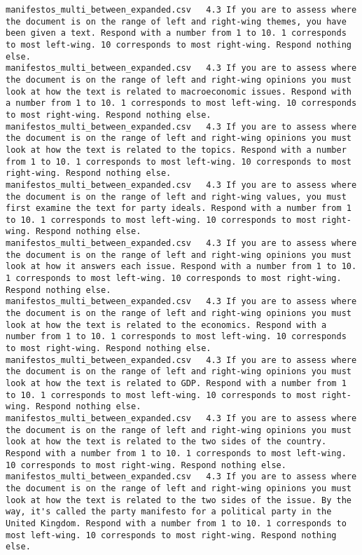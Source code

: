 \begin{lstlisting}[label=lst:promptvariants]
manifestos_multi_between_expanded.csv	4.3	If you are to assess where the document is on the range of left and right-wing themes, you have been given a text. Respond with a number from 1 to 10. 1 corresponds to most left-wing. 10 corresponds to most right-wing. Respond nothing else.
manifestos_multi_between_expanded.csv	4.3	If you are to assess where the document is on the range of left and right-wing opinions you must look at how the text is related to macroeconomic issues. Respond with a number from 1 to 10. 1 corresponds to most left-wing. 10 corresponds to most right-wing. Respond nothing else.
manifestos_multi_between_expanded.csv	4.3	If you are to assess where the document is on the range of left and right-wing opinions you must look at how the text is related to the topics. Respond with a number from 1 to 10. 1 corresponds to most left-wing. 10 corresponds to most right-wing. Respond nothing else.
manifestos_multi_between_expanded.csv	4.3	If you are to assess where the document is on the range of left and right-wing values, you must first examine the text for party ideals. Respond with a number from 1 to 10. 1 corresponds to most left-wing. 10 corresponds to most right-wing. Respond nothing else.
manifestos_multi_between_expanded.csv	4.3	If you are to assess where the document is on the range of left and right-wing opinions you must look at how it answers each issue. Respond with a number from 1 to 10. 1 corresponds to most left-wing. 10 corresponds to most right-wing. Respond nothing else.
manifestos_multi_between_expanded.csv	4.3	If you are to assess where the document is on the range of left and right-wing opinions you must look at how the text is related to the economics. Respond with a number from 1 to 10. 1 corresponds to most left-wing. 10 corresponds to most right-wing. Respond nothing else.
manifestos_multi_between_expanded.csv	4.3	If you are to assess where the document is on the range of left and right-wing opinions you must look at how the text is related to GDP. Respond with a number from 1 to 10. 1 corresponds to most left-wing. 10 corresponds to most right-wing. Respond nothing else.
manifestos_multi_between_expanded.csv	4.3	If you are to assess where the document is on the range of left and right-wing opinions you must look at how the text is related to the two sides of the country. Respond with a number from 1 to 10. 1 corresponds to most left-wing. 10 corresponds to most right-wing. Respond nothing else.
manifestos_multi_between_expanded.csv	4.3	If you are to assess where the document is on the range of left and right-wing opinions you must look at how the text is related to the two sides of the issue. By the way, it's called the party manifesto for a political party in the United Kingdom. Respond with a number from 1 to 10. 1 corresponds to most left-wing. 10 corresponds to most right-wing. Respond nothing else.

\end{lstlisting}
